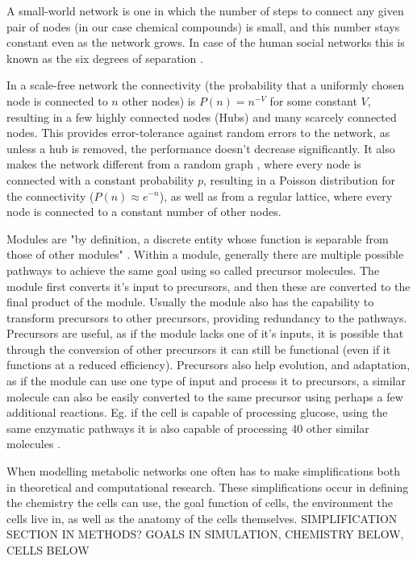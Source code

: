 \documentclass[10pt,a4paper]{article}
\begin{document}
	A small-world network \cite{smallworld} is one in which the number of steps to connect any given pair of nodes (in our case chemical compounds) is small, and this number stays constant even as the network grows. In case of the human social networks this is known as the six degrees of separation \cite{sixdegrees}.
	 
	In a scale-free network the connectivity (the probability that a uniformly chosen node is connected to $n$ other nodes) is $P(n)=n^{-V}$ for some constant $V$, resulting in a few highly connected nodes (Hubs) and many scarcely connected nodes. This provides error-tolerance against random errors to the network, as unless a hub is removed, the performance doesn't decrease significantly. It also makes the network different from a random graph \cite{randomgraphs}, where every node is connected with a constant probability $p$, resulting in a Poisson distribution for the connectivity ($P(n) \approx e^{-n}$), as well as from a regular lattice, where every node is connected to a constant number of other nodes.
	  
	Modules are "by definition, a discrete entity whose function is separable from those of other modules" \cite{modulardef}. Within a module, generally there are multiple possible pathways to achieve the same goal using so called precursor molecules. The module first converts it's input to precursors, and then these are converted to the final product of the module. Usually the module also has the capability to transform precursors to other precursors, providing redundancy to the pathways. Precursors are useful, as if the module lacks one of it's inputs, it is possible that through the conversion of other precursors it can still be functional (even if it functions at a reduced efficiency). Precursors also help evolution, and adaptation, as if the module can use one type of input and process it to precursors, a similar molecule can also be easily converted to the same precursor using perhaps a few additional reactions. Eg. if the cell is capable of processing glucose, using the same enzymatic pathways it is also capable of processing 40 other similar molecules \cite{latent}.
	
	
	When modelling metabolic networks one often has to make simplifications both in theoretical and computational research. These simplifications occur in defining the chemistry the cells can use, the goal function of cells, the environment the cells live in, as well as the anatomy of the cells themselves. SIMPLIFICATION SECTION IN METHODS? GOALS IN SIMULATION, CHEMISTRY BELOW, CELLS BELOW
	
\end{document}
